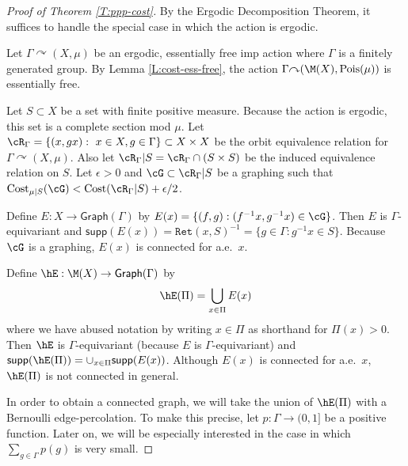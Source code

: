 \documentclass[12pt]{article}
\theoremstyle{plain}
\theoremstyle{definition}
\theoremstyle{remark}
\newcommand{\G}{\Gamma}
\newcommand{\eps}{\epsilon}
\newcommand\cost{{\operatorname{Cost}}}
\newcommand\Pois{\operatorname{Pois}}
\newcommand\Ret{\mathtt{Ret}}
\def\cc{{\curvearrowright}}
\begin{document}
\begin{proof}[Proof of Theorem \ref{T:ppp-cost}]
By the Ergodic Decomposition Theorem, it suffices to handle the special case in which the action is ergodic.

Let $\G \cc (X, \mu)$ be an ergodic, essentially free imp action where $\G$ is a finitely generated group. By Lemma \ref{L:cost-ess-free}, the action $\G \cc (\M(X), \Pois(\mu))$ is essentially free.


Let $S \subset X$ be a set with finite positive measure. Because the action is ergodic, this set is a  complete section mod $\mu$. Let $\cR_\G=\{(x,gx):~x \in X, g\in \G\}\subset X\times X$ be the orbit equivalence relation for $\G\cc(X,\mu)$. Also let $\cR_\G|S=\cR_\G \cap (S\times S)$ be the induced equivalence relation on $S$. Let $\eps>0$ and $\cG \subset \cR_\G|S$ be a graphing such that $\cost_{\mu|S}(\cG) < \cost(\cR_\G|S) + \epsilon/2$. 


 



Define $E: X \to \mathsf{Graph}(\G)$ by $E(x) = \{ (f, g) : (f^{-1}x, g^{-1}x) \in \cG\}$. Then $E$ is $\G$-equivariant and $\mathsf{supp}(E(x))=\Ret(x, S)^{-1} = \{g \in \G : g^{-1}x \in S\}$. Because $\cG$ is a graphing, $E(x)$ is connected for a.e.\ $x$. 

Define $\hE: \M(X) \to \mathsf{Graph}(\G)$  by 
 \[ \hE(\Pi) =\bigcup_{x \in \Pi} E(x)\]
where we have abused notation by writing $x\in \Pi$ as shorthand for $\Pi(x)>0$. Then $\hE$ is $\G$-equivariant (because $E$ is $\G$-equivariant) and $\mathsf{supp}(\hE(\Pi))= \cup_{x\in \Pi} \mathsf{supp}(E(x))$. Although $E(x)$ is connected for a.e.\ $x$, $\hE(\Pi)$ is not connected in general. 

In order to obtain a connected graph, we will take the union of $\hE(\Pi)$ with a Bernoulli edge-percolation. To make this precise, let $p:\G \to (0,1]$ be a positive function. Later on, we will be especially interested in the case in which $\sum_{g\in \G} p(g)$ is very small.


\end{proof}
\end{document}
